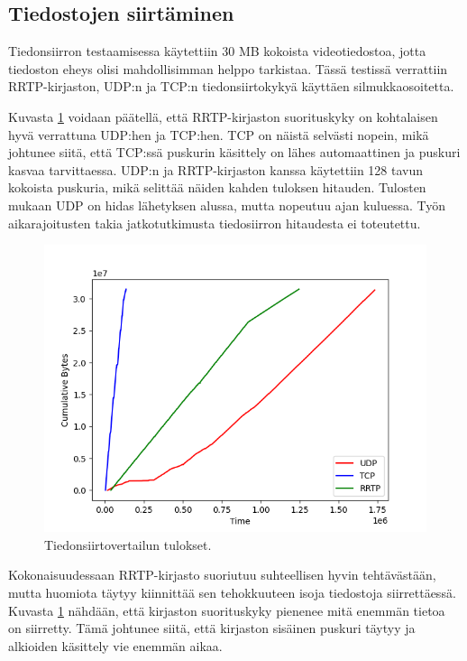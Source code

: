 \documentclass[a4paper,12pt]{article}
\begin{document}
    \subsection{Tiedostojen siirtäminen}


Tiedonsiirron testaamisessa käytettiin 30 MB kokoista videotiedostoa, jotta 
tiedoston eheys olisi mahdollisimman helppo tarkistaa.
Tässä testissä verrattiin RRTP-kirjaston, UDP:n ja TCP:n 
tiedonsiirtokykyä käyttäen silmukkaosoitetta. \par
Kuvasta \ref{fig:performance} voidaan päätellä, että 
RRTP-kirjaston suorituskyky on kohtalaisen hyvä verrattuna UDP:hen ja TCP:hen. TCP on näistä selvästi nopein, mikä johtunee siitä, että
TCP:ssä puskurin käsittely on lähes automaattinen ja puskuri kasvaa tarvittaessa. 
UDP:n ja RRTP-kirjaston kanssa käytettiin 128 tavun kokoista puskuria, mikä selittää näiden kahden tuloksen hitauden. Tulosten mukaan UDP on 
hidas lähetyksen alussa, mutta nopeutuu ajan kuluessa. Työn aikarajoitusten takia jatkotutkimusta tiedosiirron hitaudesta ei toteutettu. \par
    
    \begin{figure}[h!]
        \centering
        \includegraphics[width=\textwidth]{doc/latex/src/images/plot.png}
        \caption{Tiedonsiirtovertailun tulokset.}
        \label{fig:performance}
    \end{figure}

    
Kokonaisuudessaan RRTP-kirjasto suoriutuu suhteellisen hyvin tehtävästään, mutta huomiota täytyy kiinnittää sen tehokkuuteen isoja tiedostoja siirrettäessä. Kuvasta \ref{fig:performance} nähdään, että kirjaston suorituskyky pienenee mitä enemmän tietoa on siirretty. Tämä johtunee siitä, että kirjaston sisäinen puskuri täytyy ja alkioiden käsittely vie enemmän aikaa.
\end{document}
